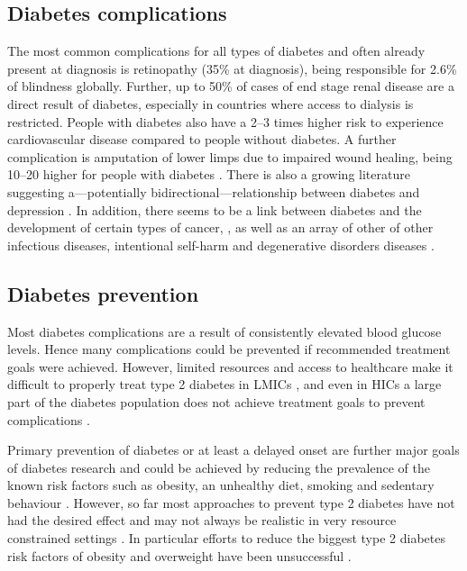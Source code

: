 \subsection{Diabetes complications}

The most common complications for all types of diabetes and often already present at diagnosis is retinopathy (35\% at diagnosis), being responsible for 2.6\% of blindness globally. Further, up to 50\% of cases of end stage renal disease are a direct result of diabetes, especially in countries where access to dialysis is restricted. People with diabetes also have a 2--3 times higher risk to experience cardiovascular disease compared to people without diabetes. A further complication is amputation of lower limps due to impaired wound healing, being 10--20 higher for people with diabetes \parencite{WorldHealthOrganization2016}. There is also a growing literature suggesting a---potentially bidirectional---relationship between diabetes and depression \parencite{VanDooren2013,Nouwen2010,Roy2012}. In addition, there seems to be a link between diabetes and the development of certain types of cancer, \parencite{Tsilidis2015,Nead2015}, as well as an array of other of other infectious diseases, intentional self-harm and degenerative disorders diseases \parencite{Seshasai2011}.


\subsection{Diabetes prevention}

Most diabetes complications are a result of consistently elevated blood glucose levels. Hence many complications could be prevented if recommended treatment goals were achieved. However, limited resources and access to healthcare make it difficult to properly treat type 2 diabetes in \acp{LMIC} \parencite{Villalpando2010}, and even in \acp{HIC} a large part of the diabetes population does not achieve treatment goals to prevent complications \parencite{DiabetesUK2012}. 

Primary prevention of diabetes or at least a delayed onset are further major goals of diabetes research and could be achieved by reducing the prevalence of the known risk factors such as obesity, an unhealthy diet, smoking and sedentary behaviour \parencite{WorldHealthOrganization2016}. However, so far most approaches to prevent type 2 diabetes have not had the desired effect and may not always be realistic in very resource constrained settings \parencite{White2016}. In particular efforts to reduce the biggest type 2 diabetes risk factors of obesity and overweight have been unsuccessful \parencite{Roberto2015}.

